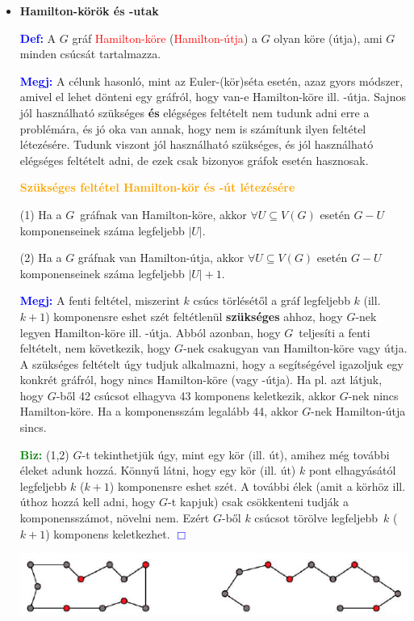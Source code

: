 \documentclass[../../szobeli.tex]{subfiles}
\begin{document}
\begin{itemize}
        \item \textbf{Hamilton-körök és -utak} 

        \textcolor{blue}{\textbf{Def:}} A $G$ gráf \textcolor{red}{Hamilton-köre} (\textcolor{red}{Hamilton-útja}) a $G$ olyan köre (útja), ami $G$ minden csúcsát tartalmazza. 

        \textcolor{blue}{\textbf{Megj:}} A célunk hasonló, mint az Euler-(kör)séta esetén, azaz gyors módszer, amivel el lehet dönteni egy gráfról, hogy van-e Hamilton-köre ill. -útja. Sajnos jól használható szükséges \textbf{és} elégséges feltételt nem tudunk adni erre a problémára, és jó oka van annak, hogy nem is számítunk ilyen feltétel létezésére. Tudunk viszont jól használható szükséges, és jól használható elégséges feltételt adni, de ezek csak bizonyos gráfok esetén hasznosak.
        
        \textcolor{orange}{\textbf{Szükséges feltétel Hamilton-kör és -út létezésére}}

        (1) Ha a $G$ gráfnak van Hamilton-köre, akkor $\forall U \subseteq V(G)$ esetén $G-U$ komponenseinek száma legfeljebb $|U|$.

        (2) Ha a $G$ gráfnak van Hamilton-útja, akkor $\forall U \subseteq V(G)$ esetén $G-U$ komponenseinek száma legfeljebb $|U|+1$. 

        \textcolor{blue}{\textbf{Megj:}} A fenti feltétel, miszerint $k$ csúcs törlésétől a gráf legfeljebb $k$ (ill. $k+1$) komponensre eshet szét feltétlenül \textbf{szükséges} ahhoz, hogy $G$-nek legyen Hamilton-köre ill. -útja. Abból azonban, hogy $G$ teljesíti a fenti feltételt, nem következik, hogy $G$-nek csakugyan van Hamilton-köre vagy útja. A szükséges feltételt úgy tudjuk alkalmazni, hogy a segítségével igazoljuk egy konkrét gráfról, hogy nincs Hamilton-köre (vagy -útja). Ha pl. azt látjuk, hogy $G$-ből 42 csúcsot elhagyva 43 komponens keletkezik, akkor $G$-nek nincs Hamilton-köre. Ha a komponensszám legalább 44, akkor $G$-nek Hamilton-útja sincs.
        
        \textcolor{green}{\textbf{Biz:}} (1,2) $G$-t tekinthetjük úgy, mint egy kör (ill. út), amihez még további éleket adunk hozzá. Könnyű látni, hogy egy kör (ill. út) $k$ pont elhagyásától legfeljebb $k$ ($k+1$) komponensre eshet szét. A további élek (amit a körhöz ill. úthoz hozzá kell adni, hogy $G$-t kapjuk) csak csökkenteni tudják a komponensszámot, növelni nem. Ezért $G$-ből $k$ csúcsot törölve legfeljebb $k$ ($k+1$) komponens keletkezhet. \textcolor{blue}{$\Box$}

        \includegraphics[width=\textwidth]{./img/4.png}


\end{itemize}
\end{document}
